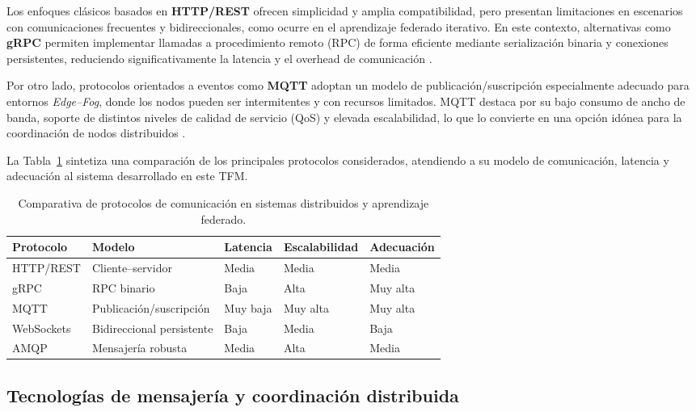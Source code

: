 \documentclass{report}
\begin{document}
Los enfoques clásicos basados en \textbf{HTTP/REST} ofrecen simplicidad y amplia compatibilidad, pero presentan limitaciones en escenarios con comunicaciones frecuentes y bidireccionales, como ocurre en el aprendizaje federado iterativo. En este contexto, alternativas como \textbf{gRPC} permiten implementar llamadas a procedimiento remoto (RPC) de forma eficiente mediante serialización binaria y conexiones persistentes, reduciendo significativamente la latencia y el overhead de comunicación \cite{grpc2023}.

Por otro lado, protocolos orientados a eventos como \textbf{MQTT} adoptan un modelo de publicación/suscripción especialmente adecuado para entornos \textit{Edge--Fog}, donde los nodos pueden ser intermitentes y con recursos limitados. MQTT destaca por su bajo consumo de ancho de banda, soporte de distintos niveles de calidad de servicio (QoS) y elevada escalabilidad, lo que lo convierte en una opción idónea para la coordinación de nodos distribuidos \cite{hunkeler2008mqtt}.

La Tabla~\ref{tab:comparativa-protocolos} sintetiza una comparación de los principales protocolos considerados, atendiendo a su modelo de comunicación, latencia y adecuación al sistema desarrollado en este TFM.


\begin{table}[H]
\centering
\footnotesize
\caption{Comparativa de protocolos de comunicación en sistemas distribuidos y aprendizaje federado.}
\label{tab:comparativa-protocolos}
\renewcommand{\arraystretch}{1.2}
\setlength{\tabcolsep}{3pt}

\begin{tabularx}{\linewidth}{p{2.2cm} X p{1.6cm} p{1.8cm} p{2.2cm}}
\toprule
\textbf{Protocolo} & \textbf{Modelo} & \textbf{Latencia} & \textbf{Escalabilidad} & \textbf{Adecuación} \\
\midrule
HTTP/REST & Cliente--servidor & Media & Media & Media \\
gRPC & RPC binario & Baja & Alta & Muy alta \\
MQTT & Publicación/suscripción & Muy baja & Muy alta & Muy alta \\
WebSockets & Bidireccional persistente & Baja & Media & Baja \\
AMQP & Mensajería robusta & Media & Alta & Media \\
\bottomrule
\end{tabularx}
\end{table}


\subsection{Tecnologías de mensajería y coordinación distribuida}
\label{sec:mensajeria}
\end{document}
